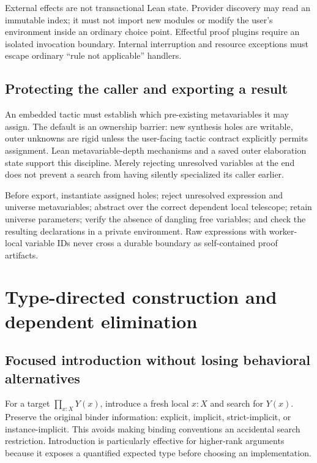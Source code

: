 \documentclass[11pt,letterpaper]{article}
\theoremstyle{definition}\newtheorem{definition}[theorem]{Definition}
\theoremstyle{remark}\newtheorem{remark}[theorem]{Remark}
\begin{document}
External effects are not transactional Lean state. Provider discovery may read
an immutable index; it must not import new modules or modify the user's environment
inside an ordinary choice point. Effectful proof plugins require an isolated
invocation boundary. Internal interruption and resource exceptions must escape
ordinary ``rule not applicable'' handlers.

\subsection{Protecting the caller and exporting a result}

An embedded tactic must establish which pre-existing metavariables it may assign.
The default is an ownership barrier: new synthesis holes are writable, outer
unknowns are rigid unless the user-facing tactic contract explicitly permits
assignment. Lean metavariable-depth mechanisms and a saved outer elaboration
state support this discipline. Merely rejecting unresolved variables at the end
does not prevent a search from having silently specialized its caller earlier.
\cite{metabook}

Before export, instantiate assigned holes; reject unresolved expression and
universe metavariables; abstract over the correct dependent local telescope;
retain universe parameters; verify the absence of dangling free variables; and
check the resulting declarations in a private environment. Raw expressions with
worker-local variable IDs never cross a durable boundary as self-contained proof
artifacts.

\section{Type-directed construction and dependent elimination}
\label{sec:structural}

\subsection{Focused introduction without losing behavioral alternatives}

For a target $\prod_{x:X}Y(x)$, introduce a fresh local $x:X$ and search for
$Y(x)$. Preserve the original binder information: explicit, implicit,
strict-implicit, or instance-implicit. This avoids making binding conventions an
accidental search restriction. Introduction is particularly effective for
higher-rank arguments because it exposes a quantified expected type before
choosing an implementation.
\end{document}
